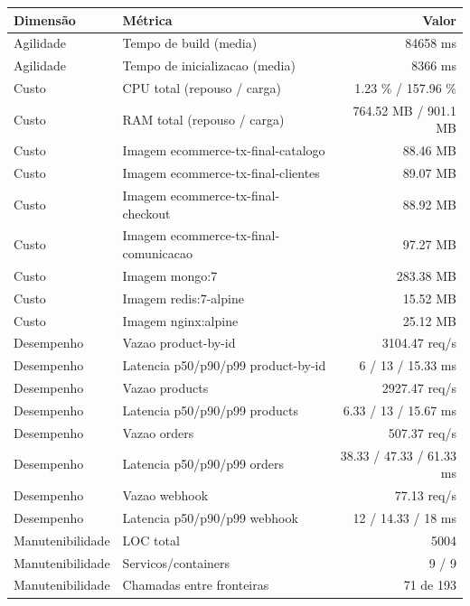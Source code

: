 \begin{quadro}[htb]
  \centering
  \caption{Métricas (ecommerce, transacoes, snapshot-final).}
  \label{qua:metricas-ecommerce-transacoes-snapshot-final}
  \renewcommand{\arraystretch}{1.15}
  \begin{tabular}{|l|l|r|}
    \hline
    \textbf{Dimensão} & \textbf{Métrica} & \textbf{Valor} \\
    \hline
    Agilidade & Tempo de build (media) & 84658 ms \\ \hline
    Agilidade & Tempo de inicializacao (media) & 8366 ms \\ \hline
    Custo & CPU total (repouso / carga) & 1.23 \% / 157.96 \% \\ \hline
    Custo & RAM total (repouso / carga) & 764.52 MB / 901.1 MB \\ \hline
    Custo & Imagem ecommerce-tx-final-catalogo & 88.46 MB \\ \hline
    Custo & Imagem ecommerce-tx-final-clientes & 89.07 MB \\ \hline
    Custo & Imagem ecommerce-tx-final-checkout & 88.92 MB \\ \hline
    Custo & Imagem ecommerce-tx-final-comunicacao & 97.27 MB \\ \hline
    Custo & Imagem mongo:7 & 283.38 MB \\ \hline
    Custo & Imagem redis:7-alpine & 15.52 MB \\ \hline
    Custo & Imagem nginx:alpine & 25.12 MB \\ \hline
    Desempenho & Vazao product-by-id & 3104.47 req/s \\ \hline
    Desempenho & Latencia p50/p90/p99 product-by-id & 6 / 13 / 15.33 ms \\ \hline
    Desempenho & Vazao products & 2927.47 req/s \\ \hline
    Desempenho & Latencia p50/p90/p99 products & 6.33 / 13 / 15.67 ms \\ \hline
    Desempenho & Vazao orders & 507.37 req/s \\ \hline
    Desempenho & Latencia p50/p90/p99 orders & 38.33 / 47.33 / 61.33 ms \\ \hline
    Desempenho & Vazao webhook & 77.13 req/s \\ \hline
    Desempenho & Latencia p50/p90/p99 webhook & 12 / 14.33 / 18 ms \\ \hline
    Manutenibilidade & LOC total & 5004 \\ \hline
    Manutenibilidade & Servicos/containers & 9 / 9 \\ \hline
    Manutenibilidade & Chamadas entre fronteiras & 71 de 193 \\ \hline
  \end{tabular}
\end{quadro}
